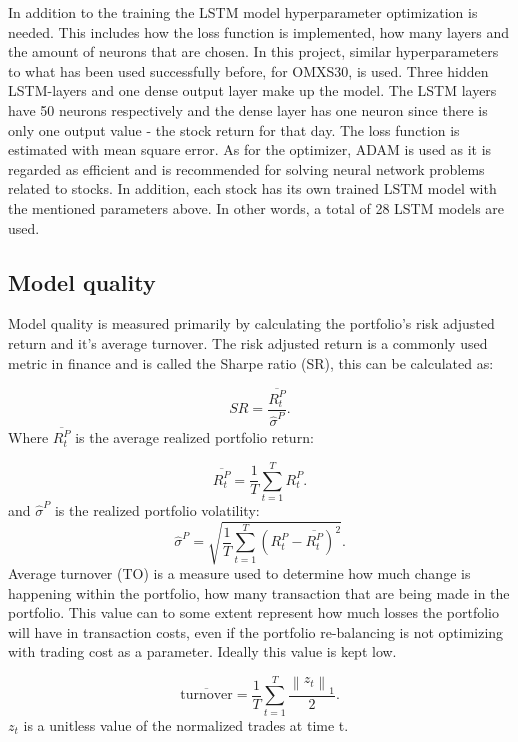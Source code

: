 \documentclass[final]{LTHtwocol} %
\begin{document}
In addition to the training the LSTM model hyperparameter optimization is needed.  This includes how the loss function is implemented, how many layers and the amount of neurons that are chosen. In this project, similar hyperparameters to what has been used successfully before, for OMXS30, is used. Three hidden LSTM-layers and one dense output layer make up the model. The LSTM layers have 50 neurons respectively and the dense layer has one neuron since there is only one output value - the stock return for that day. The loss function is estimated with mean square error. As for the optimizer, ADAM is used as it is regarded as efficient and is recommended for solving neural network problems related to stocks. \cite{uppsala} In addition, each stock has its own trained LSTM model with the mentioned parameters above. In other words, a total of 28 LSTM models are used.

\subsection{Model quality}
Model quality is measured primarily by calculating the portfolio's risk adjusted return and it's average turnover. The risk adjusted return is a commonly used metric in finance and is called the Sharpe ratio (SR),\cite{ref:sharpe} this can be calculated as:

$$
SR = \frac{\overline{R^{P}_{t}}}{\widehat{\sigma}^{P}}.
$$
Where $\overline{R^{P}_{t}}$ is the average realized portfolio return: 

$$
\overline{R^{P}_{t}} = \frac{1}{T}\sum_{t=1}^{T}R_{t}^{P}.
$$
and $\widehat{\sigma}^{P}$ is the realized portfolio volatility:
$$
\widehat{\sigma}^{P} = \sqrt{\frac{1}{T}\sum_{t=1}^{T}(R_{t}^{P}-\overline{R^{P}_{t}})^{2}}.
$$
Average turnover (TO) is a measure used to determine how much change is happening within the portfolio, how many transaction that are being made in the portfolio. This value can to some extent represent how much losses the portfolio will have in transaction costs, even if the portfolio re-balancing is not optimizing with trading cost as a parameter. Ideally this value is kept low.

$$
\overline{\text{turnover}} = \frac{1}{T}\sum_{t=1}^{T}\frac{\left\lVert z_{t} \right\rVert_{1} }{2}.
$$
$z_{t}$ is a unitless value of the normalized trades at time t.
\end{document}
